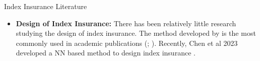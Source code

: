 \documentclass{beamer}
\begin{document}

\begin{frame}{Index Insurance Literature}
 \begin{itemize}
     \item \textbf{Design of Index Insurance:} There has been relatively little research studying the design of index insurance. The method developed by \cite{chantarat2013designing} is the most commonly used in academic publications (\cite{jensen2019does};  \cite{flatnes2018improving}). Recently, Chen et al 2023 developed a NN based method to design index insurance \cite{chen2023managing}. 
 \end{itemize}
\end{frame}

     
\end{document}
